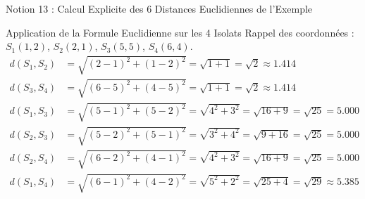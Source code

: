 \documentclass[aspectratio=169,10pt]{beamer}
\begin{document}
\begin{frame}{Notion 13 : Calcul Explicite des 6 Distances Euclidiennes de l'Exemple}
  \begin{conceptbox}{Application de la Formule Euclidienne sur les 4 Isolats}
    \footnotesize
    Rappel des coordonnées : $S_1(1,2)$, $S_2(2,1)$, $S_3(5,5)$, $S_4(6,4)$.
    \begin{align*}
      d(S_1, S_2) &= \sqrt{(2-1)^2 + (1-2)^2} = \sqrt{1 + 1} = \sqrt{2} \approx \mathbf{1.414} \\
      d(S_3, S_4) &= \sqrt{(6-5)^2 + (4-5)^2} = \sqrt{1 + 1} = \sqrt{2} \approx \mathbf{1.414} \\
      d(S_1, S_3) &= \sqrt{(5-1)^2 + (5-2)^2} = \sqrt{4^2 + 3^2} = \sqrt{16 + 9} = \sqrt{25} = \mathbf{5.000} \\
      d(S_2, S_3) &= \sqrt{(5-2)^2 + (5-1)^2} = \sqrt{3^2 + 4^2} = \sqrt{9 + 16} = \sqrt{25} = \mathbf{5.000} \\
      d(S_2, S_4) &= \sqrt{(6-2)^2 + (4-1)^2} = \sqrt{4^2 + 3^2} = \sqrt{16 + 9} = \sqrt{25} = \mathbf{5.000} \\
      d(S_1, S_4) &= \sqrt{(6-1)^2 + (4-2)^2} = \sqrt{5^2 + 2^2} = \sqrt{25 + 4} = \sqrt{29} \approx \mathbf{5.385}
    \end{align*}
  \end{conceptbox}
\end{frame}
\end{document}
